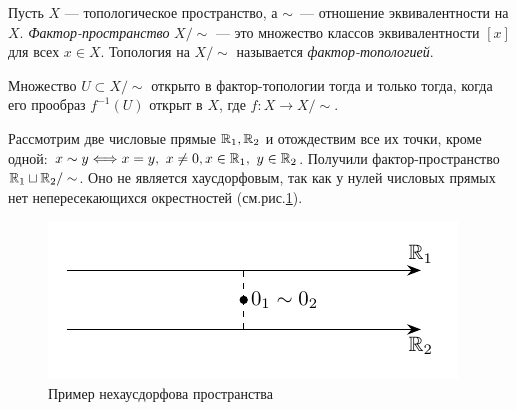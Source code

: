 
\begin{definition}
    Пусть $X$ — топологическое пространство, а $\sim$ — отношение эквивалентности на $X$. \textit{Фактор-пространство} $X / \sim$ — это множество классов эквивалентности $[x]$ для всех $x \in X$. Топология на $X / \sim$ называется \textit{фактор-топологией}.

    Множество $U \subset X / \sim $ открыто в фактор-топологии тогда и только тогда, когда его прообраз $f^{-1}(U)$ открыт в $X$, где $f: X \to X / \sim$.
\end{definition}

\begin{example}
    Рассмотрим две числовые прямые $\mathbb{R}_1, \mathbb{R}_2$ и отождествим все их точки, кроме одной: $x \sim y \Longleftrightarrow x = y, \ x \ne 0, x \in \mathbb{R}_1, \ y \in \mathbb{R}_2$. 
    Получили фактор-пространство $\mathbb{R}_1 \sqcup \mathbb{R}_2 / \sim$.
    Оно не является хаусдорфовым, так как у нулей числовых прямых нет непересекающихся окрестностей (см.рис.\ref{fig:c2.1}).

    \begin{figure}[h]
        \centering
        \includegraphics{images/c2.1.pdf}
        \caption{Пример нехаусдорфова пространства}
        \label{fig:c2.1}
    \end{figure}
\end{example}
